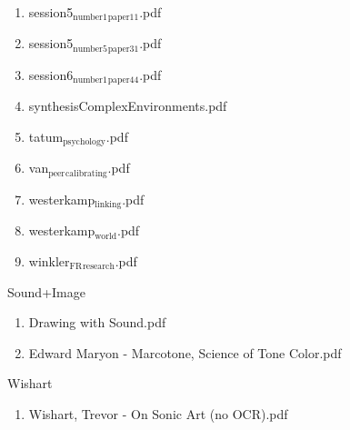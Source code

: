 \documentclass[11pt]{article}
\begin{document}
\begin{enumerate}
\begin{enumerate}
\begin{enumerate}
\item session5$_{\text{number1}}$$_{\text{paper11}}$.pdf
\label{sec-1-1-1-1-11-19-20-20-2-54}

\item session5$_{\text{number5}}$$_{\text{paper31}}$.pdf
\label{sec-1-1-1-1-11-19-20-20-2-55}

\item session6$_{\text{number1}}$$_{\text{paper44}}$.pdf
\label{sec-1-1-1-1-11-19-20-20-2-56}

\item synthesisComplexEnvironments.pdf
\label{sec-1-1-1-1-11-19-20-20-2-57}

\item tatum$_{\text{psychology}}$.pdf
\label{sec-1-1-1-1-11-19-20-20-2-58}

\item van$_{\text{peer}}$$_{\text{calibrating}}$.pdf
\label{sec-1-1-1-1-11-19-20-20-2-59}

\item westerkamp$_{\text{linking}}$.pdf
\label{sec-1-1-1-1-11-19-20-20-2-60}

\item westerkamp$_{\text{world}}$.pdf
\label{sec-1-1-1-1-11-19-20-20-2-61}

\item winkler$_{\text{FR}}$$_{\text{research}}$.pdf
\label{sec-1-1-1-1-11-19-20-20-2-62}
\end{enumerate}
\end{enumerate}
\end{enumerate}

\item Sound+Image
\label{sec-1-1-1-1-11-19-21}
\begin{enumerate}
\item Drawing with Sound.pdf
\label{sec-1-1-1-1-11-19-21-1}

\item Edward Maryon - Marcotone, Science of Tone Color.pdf
\label{sec-1-1-1-1-11-19-21-2}
\end{enumerate}

\item Wishart
\label{sec-1-1-1-1-11-19-22}
\begin{enumerate}
\item Wishart, Trevor - On Sonic Art (no OCR).pdf
\label{sec-1-1-1-1-11-19-22-1}
\end{enumerate}
\end{document}
